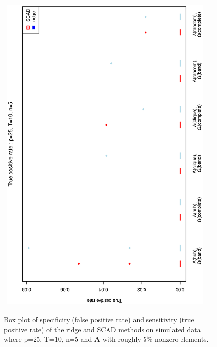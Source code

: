 \documentclass[a4paper]{article}
\begin{document}
\begin{figure}[h!]
\begin{tabular}{cc}
\includegraphics[scale=0.45,angle=270]{ROCtpr25T10N5_5.eps}
\end{tabular}
\caption{Box plot of specificity (false positive rate) and sensitivity (true positive rate) of the ridge and SCAD methods on simulated data where p=25, T=10,  n=5 and $\mathbf{A}$ with roughly $5\%$ nonzero elements.}
\label{figSM:RocP25T10N5_5}
\end{figure}


\end{document}
